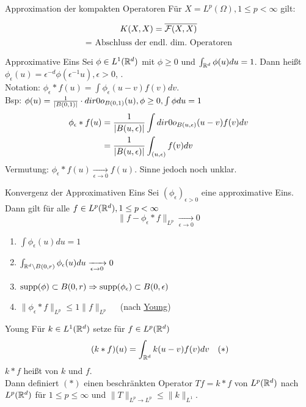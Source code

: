 	\begin{karte}{Approximation der kompakten Operatoren}
			Für $X = L^{p}(\Omega), 1 \leq p < \infty$ gilt:
			
		\[ K(X, X) = \overline{\mathcal{F}(X, X)} \] \[ = \text{ Abschluss der endl. dim. Operatoren} \]	
	\end{karte}

	\begin{karte}{Approximative Eins}
		Sei $\phi \in L^{1}(\mathbb{R}^{d})$ mit $\phi \geq 0$ und $\int_{\mathbb{R}^{d}} \phi(u) du = 1$. Dann hei{\ss}t $\phi_{\epsilon}(u) = \epsilon^{-d} \phi(\epsilon^{-1} u), \epsilon > 0$,	. \\
		Notation: $\phi_{\epsilon} \ast f(u) = \int \phi_{\epsilon}(u - v) f(v) dv$. \\
		Bsp: $\phi(u) = \frac{1}{|B(0, 1)|} \cdot \1_{B(0, 1)}(u), \phi \geq 0, \int \phi du = 1	$ \\
	\begin{align*}
		\phi_{\epsilon} \ast f(u) & = \frac{1}{|B(u, \epsilon)|} \int \1_{B(u, \epsilon)}(u - v) f(v) dv \\
		&  = \frac{1}{|B(u, \epsilon)|} \int_{(u, \epsilon)} f(v) dv 
	\end{align*}
	Vermutung: $\phi_{\epsilon} \ast f(u) \xrightarrow[\epsilon \rightarrow 0]{} f(u)$.  Sinne jedoch noch unklar.		

	\end{karte}
	
	\begin{karte}{Konvergenz der Approximativen Eins}
		Sei $(\phi_{\epsilon})_{\epsilon > 0}$ eine approximative Eins. Dann gilt für alle $f \in L^{p}(\mathbb{R}^{d}), 1 \leq p < \infty$
		\[ \| f - \phi_{\epsilon} \ast f \|_{L^{p}} \xrightarrow[\epsilon \rightarrow 0]{} 0 \]
			\begin{enumerate}[label=\roman*\upshape)]
		\item $\int \phi_{\epsilon}(u) du = 1$
		\item $\int_{\mathbb{R}^{d} \setminus B(0, r)} \phi_{\epsilon}(u) du \xrightarrow[\epsilon \rightarrow 0]{} 0$
		\item $\operatorname{supp}(\phi) \subset B(0, r) \Rightarrow \operatorname{supp}(\phi_{\epsilon}) \subset B(0, \epsilon)$
		\item $\| \phi_{\epsilon} \ast f \|_{L^{p}} \leq 1 \| f \|_{L^{p}} \quad$ (nach \hyperref[satz:8.5-Young]{Young})
	\end{enumerate}	
	\end{karte}

	\begin{karte}{Young}
		Für $k \in L^{1}(\mathbb{R}^{d})$ setze für $f \in L^{p}(\mathbb{R}^{d})$
		\[ (k \ast f) (u) = \int_{\MdR^{d}} k(u - v) f(v) dv \quad (*) \label{eq:8.5-Young} \]
		$k \ast f$ hei{\ss}t  von $k$ und $f$. \\
		Dann definiert \hyperref[eq:8.5-Young]{$(*)$} einen beschränkten Operator $T f = k \ast f$ von $L^{p}(\mathbb{R}^{d})$ nach $L^{p}(\mathbb{R}^{d})$ für $1 \leq p \leq \infty$ und $\|T\|_{L^{p} \rightarrow L^{p}} \leq \|k\|_{L^{1}}$.
	\end{karte}
	
